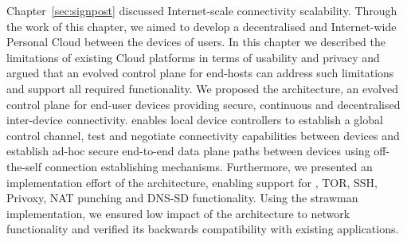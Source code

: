 Chapter~\ref{sec:signpost} discussed Internet-scale connectivity scalability.
Through the work of this chapter, we aimed to develop a decentralised and
Internet-wide Personal Cloud between the devices of users. In this chapter we
described the limitations of existing Cloud platforms in terms of usability and
privacy and argued that an evolved control plane for end-hosts can address such
limitations and support all required functionality.  We proposed the \signpost
architecture, an evolved control plane for end-user devices providing secure,
continuous and decentralised inter-device connectivity. \signpost enables local
device controllers to establish a global control channel, test and negotiate
connectivity capabilities between devices and establish ad-hoc secure end-to-end
data plane paths between devices using off-the-self connection establishing
mechanisms. Furthermore, we presented an implementation effort of the \signpost
architecture, enabling support for \openvpn, TOR, SSH, Privoxy, NAT punching and
DNS-SD functionality. Using the \signpost strawman implementation, we ensured
low impact of the architecture to network functionality and verified its
backwards compatibility with existing applications. 


